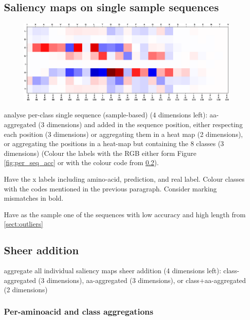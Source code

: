 	\subsection{Saliency maps on single sample sequences}
	\begin{figure}
\centering
\includegraphics[width=1\linewidth]{Figures/sample_8classes}
\caption{}
\label{fig:sample_8classes}
\end{figure}

	
	analyse per-class single sequence (sample-based) (4 dimensions left): aa-aggregated (3 dimensions) and added in the sequence position, either respecting each position (3 dimensions) or aggregating them in a heat map (2 dimensions), or aggregating the positions in a heat-map but containing the 8 classes (3 dimensions) (Colour the labels with the RGB either form Figure \ref{fig:per_seq_acc} or with the colour code from \ref{sect:sheer}).
	
	Have the x labels including amino-acid, prediction, and real label. Colour classes with the codes mentioned in the previous paragraph. Consider marking mismatches in bold.
	
	Have as the sample one of the sequences with low accuracy and high length from \ref{sect:outliers}

	\subsection{Sheer addition} \label{sect:sheer}
	aggregate all individual saliency maps %
	sheer addition (4 dimensions left): class-aggregated (3 dimensions), aa-aggregated (3 dimensions), or class+aa-aggregated (2 dimensions)
		\subsubsection{Per-aminoacid and class aggregations}
		
